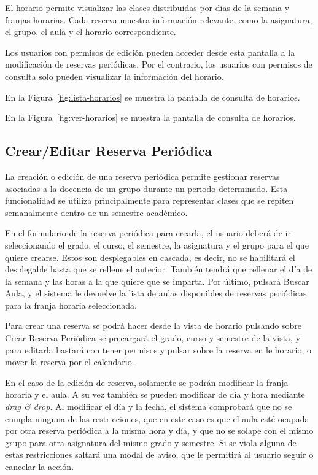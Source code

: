 El horario permite visualizar las clases distribuidas por días de la semana y franjas horarias. Cada reserva muestra información relevante, como la asignatura, el grupo, el aula y el horario correspondiente.

Los usuarios con permisos de edición pueden acceder desde esta pantalla a la modificación de reservas periódicas. Por el contrario, los usuarios con permisos de consulta solo pueden visualizar la información del horario.

En la Figura~\ref{fig:lista-horarios} se muestra la pantalla de consulta de horarios.



En la Figura~\ref{fig:ver-horarios} se muestra la pantalla de consulta de horarios.



\subsection{Crear/Editar Reserva Periódica}

La creación o edición de una reserva periódica permite gestionar reservas asociadas a la docencia de un grupo durante un periodo determinado. Esta funcionalidad se utiliza principalmente para representar clases que se repiten semanalmente dentro de un semestre académico.

En el formulario de la reserva periódica para crearla, el usuario deberá de ir seleccionando el grado, el curso, el semestre, la asignatura y el grupo para el que quiere crearse. Estos son desplegables en cascada, es decir, no se habilitará el desplegable hasta que se rellene el anterior. También tendrá que rellenar el día de la semana y las horas a la que quiere que se imparta. Por último, pulsará Buscar Aula, y el sistema le devuelve la lista de aulas disponibles de reservas periódicas para la franja horaria seleccionada.

Para crear una reserva se podrá hacer desde la vista de horario pulsando sobre Crear Reserva Periódica se precargará el grado, curso y semestre de la vista, y para editarla bastará con tener permisos y pulsar sobre la reserva en le horario, o mover la reserva por el calendario.

En el caso de la edición de reserva, solamente se podrán modificar la franja horaria y el aula. A su vez también se pueden modificar de día y hora mediante \textit{drag \& drop}. Al modificar el día y la fecha, el sistema comprobará que no se cumpla ninguna de las restricciones, que en este caso es que el aula esté ocupada por otra reserva periódica a la misma hora y día, y que no se solape con el mismo grupo para otra asignatura del mismo grado y semestre. Si se viola alguna de estas restricciones saltará una modal de aviso, que le permitirá al usuario seguir o cancelar la acción.

